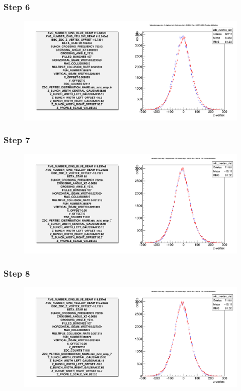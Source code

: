 \begin{frame}
  \frametitle{Step 6}
  \begin{figure}
    \includegraphics[width=\linewidth]{"./figures/tuned_simulation_step_6"}
    \label{fig:step_6}
  \end{figure}
\end{frame}

\begin{frame}
  \frametitle{Step 7}
  \begin{figure}
    \includegraphics[width=\linewidth]{"./figures/tuned_simulation_step_7"}
    \label{fig:step_7}
  \end{figure}
\end{frame}

\begin{frame}
  \frametitle{Step 8}
  \begin{figure}
    \includegraphics[width=\linewidth]{"./figures/tuned_simulation_step_8"}
    \label{fig:step_8}
  \end{figure}
\end{frame}


